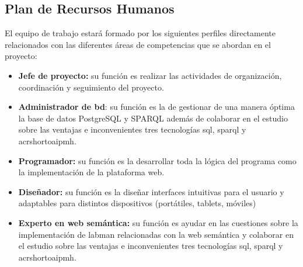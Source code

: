 \subsection{Plan de Recursos Humanos}\label{sec:planRecursosHumanos}

El equipo de trabajo estará formado por los siguientes perfiles directamente relacionados con las diferentes áreas de competencias que se abordan en el proyecto: 

\begin{itemize}
	\item \textbf{Jefe de proyecto:} su función es realizar las actividades de organización, coordinación y seguimiento del proyecto.
	\item \textbf{Administrador de \acrlong{bd}}: su función es la de gestionar de una manera óptima la base de datos PostgreSQL y SPARQL además de colaborar en el estudio sobre las ventajas e inconvenientes tres tecnologías \acrshort{sql}, \acrshort{sparql} y acrshort{oaipmh}. 
	\item \textbf{Programador:} su función es la desarrollar toda la lógica del programa como la implementación de la plataforma web. 
	\item \textbf{Diseñador:} su función es la diseñar interfaces intuitivas para el usuario y adaptables para distintos dispositivos (portátiles, tablets, móviles) 
	\item \textbf{Experto en web semántica:} su función es ayudar en las cuestiones sobre la implementación de \acrshort{labman} relacionadas con la web semántica y colaborar en el estudio sobre las ventajas e inconvenientes tres tecnologías \acrshort{sql}, \acrshort{sparql} y acrshort{oaipmh}.
\end{itemize}